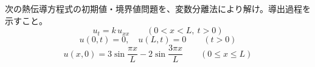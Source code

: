 
次の熱伝導方程式の初期値・境界値問題を、変数分離法により解け。導出過程を示すこと。
\[
u_t = k\,u_{xx} \qquad (0 < x < L,\ t > 0)
\]
\[
u(0,t) = 0,\quad u(L,t) = 0 \qquad (t > 0)
\]
\[
u(x,0) = 3\sin\frac{\pi x}{L} - 2\sin\frac{3\pi x}{L} \qquad (0 \le x \le L)
\]
